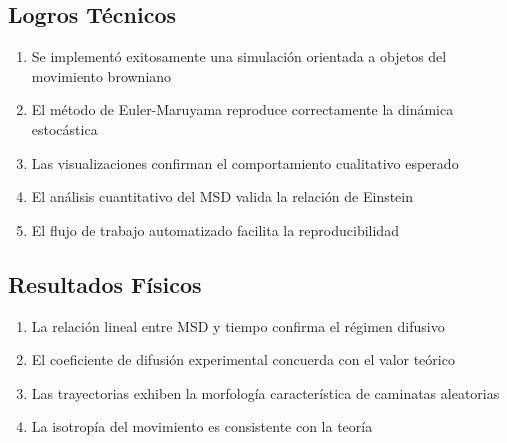 \documentclass[11pt,a4paper]{article}
\begin{document}
\subsection{Logros Técnicos}
\begin{enumerate}
    \item Se implementó exitosamente una simulación orientada a objetos del movimiento browniano
    \item El método de Euler-Maruyama reproduce correctamente la dinámica estocástica
    \item Las visualizaciones confirman el comportamiento cualitativo esperado
    \item El análisis cuantitativo del MSD valida la relación de Einstein
    \item El flujo de trabajo automatizado facilita la reproducibilidad
\end{enumerate}

\subsection{Resultados Físicos}
\begin{enumerate}
    \item La relación lineal entre MSD y tiempo confirma el régimen difusivo
    \item El coeficiente de difusión experimental concuerda con el valor teórico
    \item Las trayectorias exhiben la morfología característica de caminatas aleatorias
    \item La isotropía del movimiento es consistente con la teoría
\end{enumerate}
\end{document}

